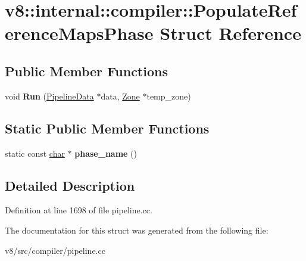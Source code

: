 \hypertarget{structv8_1_1internal_1_1compiler_1_1PopulateReferenceMapsPhase}{}\section{v8\+:\+:internal\+:\+:compiler\+:\+:Populate\+Reference\+Maps\+Phase Struct Reference}
\label{structv8_1_1internal_1_1compiler_1_1PopulateReferenceMapsPhase}
\subsection*{Public Member Functions}
\begin{DoxyCompactItemize}
\item 
\mbox{\label{structv8_1_1internal_1_1compiler_1_1PopulateReferenceMapsPhase_a6957782d774148850cd4081e779b931c}} 
void {\bfseries Run} (\mbox{\hyperlink{classv8_1_1internal_1_1compiler_1_1PipelineData}{Pipeline\+Data}} $\ast$data, \mbox{\hyperlink{classv8_1_1internal_1_1Zone}{Zone}} $\ast$temp\+\_\+zone)
\end{DoxyCompactItemize}
\subsection*{Static Public Member Functions}
\begin{DoxyCompactItemize}
\item 
\mbox{\label{structv8_1_1internal_1_1compiler_1_1PopulateReferenceMapsPhase_a4aa2557f21af3bd1553b95798cc72dd9}} 
static const \mbox{\hyperlink{classchar}{char}} $\ast$ {\bfseries phase\+\_\+name} ()
\end{DoxyCompactItemize}


\subsection{Detailed Description}


Definition at line 1698 of file pipeline.\+cc.



The documentation for this struct was generated from the following file\+:\begin{DoxyCompactItemize}
\item 
v8/src/compiler/pipeline.\+cc\end{DoxyCompactItemize}
